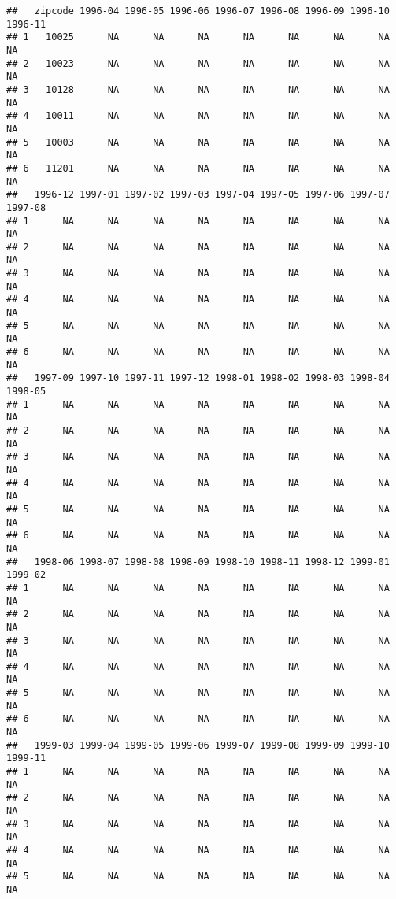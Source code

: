 \documentclass[
]{article}
\begin{document}
\begin{verbatim}
##   zipcode 1996-04 1996-05 1996-06 1996-07 1996-08 1996-09 1996-10 1996-11
## 1   10025      NA      NA      NA      NA      NA      NA      NA      NA
## 2   10023      NA      NA      NA      NA      NA      NA      NA      NA
## 3   10128      NA      NA      NA      NA      NA      NA      NA      NA
## 4   10011      NA      NA      NA      NA      NA      NA      NA      NA
## 5   10003      NA      NA      NA      NA      NA      NA      NA      NA
## 6   11201      NA      NA      NA      NA      NA      NA      NA      NA
##   1996-12 1997-01 1997-02 1997-03 1997-04 1997-05 1997-06 1997-07 1997-08
## 1      NA      NA      NA      NA      NA      NA      NA      NA      NA
## 2      NA      NA      NA      NA      NA      NA      NA      NA      NA
## 3      NA      NA      NA      NA      NA      NA      NA      NA      NA
## 4      NA      NA      NA      NA      NA      NA      NA      NA      NA
## 5      NA      NA      NA      NA      NA      NA      NA      NA      NA
## 6      NA      NA      NA      NA      NA      NA      NA      NA      NA
##   1997-09 1997-10 1997-11 1997-12 1998-01 1998-02 1998-03 1998-04 1998-05
## 1      NA      NA      NA      NA      NA      NA      NA      NA      NA
## 2      NA      NA      NA      NA      NA      NA      NA      NA      NA
## 3      NA      NA      NA      NA      NA      NA      NA      NA      NA
## 4      NA      NA      NA      NA      NA      NA      NA      NA      NA
## 5      NA      NA      NA      NA      NA      NA      NA      NA      NA
## 6      NA      NA      NA      NA      NA      NA      NA      NA      NA
##   1998-06 1998-07 1998-08 1998-09 1998-10 1998-11 1998-12 1999-01 1999-02
## 1      NA      NA      NA      NA      NA      NA      NA      NA      NA
## 2      NA      NA      NA      NA      NA      NA      NA      NA      NA
## 3      NA      NA      NA      NA      NA      NA      NA      NA      NA
## 4      NA      NA      NA      NA      NA      NA      NA      NA      NA
## 5      NA      NA      NA      NA      NA      NA      NA      NA      NA
## 6      NA      NA      NA      NA      NA      NA      NA      NA      NA
##   1999-03 1999-04 1999-05 1999-06 1999-07 1999-08 1999-09 1999-10 1999-11
## 1      NA      NA      NA      NA      NA      NA      NA      NA      NA
## 2      NA      NA      NA      NA      NA      NA      NA      NA      NA
## 3      NA      NA      NA      NA      NA      NA      NA      NA      NA
## 4      NA      NA      NA      NA      NA      NA      NA      NA      NA
## 5      NA      NA      NA      NA      NA      NA      NA      NA      NA

\end{verbatim}
\end{document}
